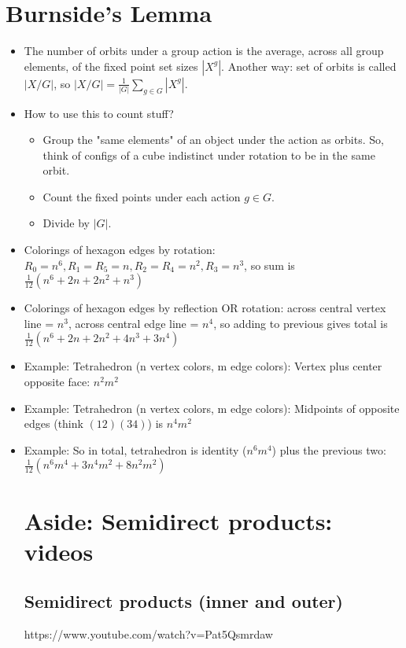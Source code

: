 \documentclass[11pt, oneside]{article}   	%
\begin{document}
\section{Burnside's Lemma}
\begin{itemize}
\item The number of orbits under a group action is the average, across all group elements, of the fixed point set sizes $|X^g|$.  Another way: set of orbits is called $|X / G|$, so $|X /G| = \frac{1}{|G|}\sum_{g \in G}|X^g|$.
\item How to use this to count stuff?  
  \begin{itemize}
  \item Group the "same elements" of an object under the action as orbits.  So, think of configs of a cube indistinct under rotation to be in the same orbit.
  \item Count the fixed points under each action $g \in G$.  
  \item Divide by $|G|$.
  \end{itemize}
  \item Colorings of hexagon edges by rotation: $R_0 = n^6, R_1 = R_5 = n, R_2 = R_4 = n^2, R_3 = n^3$, so sum is $\frac{1}{12}(n^6 + 2n + 2n^2 + n^3)$
  \item Colorings of hexagon edges by reflection OR rotation: across central vertex line = $n^3$, across central edge line = $n^4$, so adding to previous gives total is $\frac{1}{12}(n^6 + 2n + 2n^2 + 4n^3 + 3n^4)$
 \item Example: Tetrahedron (n vertex colors, m edge colors): Vertex plus center opposite face: $n^2m^2$
 \item Example: Tetrahedron (n vertex colors, m edge colors): Midpoints of opposite edges (think $(12)(34)$) is $n^4m^2$
 \item Example: So in total, tetrahedron is identity ($n^6m^4$) plus the previous two: $\frac{1}{12}(n^6m^4 + 3n^4m^2 + 8n^2m^2)$
 
 \section{Aside: Semidirect products: videos}
 \subsection{Semidirect products (inner and outer)}
 https://www.youtube.com/watch?v=Pat5Qsmrdaw
 

\end{itemize}
\end{document}
